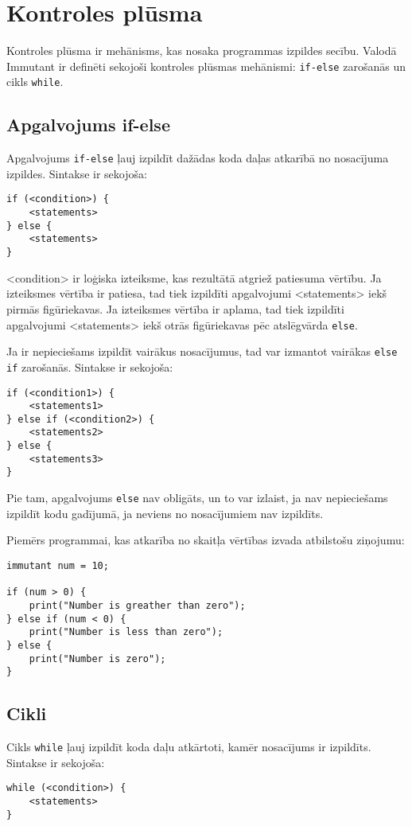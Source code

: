 \documentclass[12pt,a4paper]{report}
\begin{document}
\section{Kontroles plūsma}
Kontroles plūsma ir mehānisms, kas nosaka programmas izpildes secību. Valodā Immutant ir definēti sekojoši kontroles plūsmas mehānismi: \texttt{if-else} zarošanās un cikls \texttt{while}.

\subsection{Apgalvojums if-else}

Apgalvojums \texttt{if-else} ļauj izpildīt dažādas koda daļas atkarībā no nosacījuma izpildes. Sintakse ir sekojoša:
\begin{verbatim}
if (<condition>) {
    <statements>
} else {
    <statements>
}
\end{verbatim}

<condition> ir loģiska izteiksme, kas rezultātā atgriež patiesuma vērtību. Ja izteiksmes vērtība ir patiesa, tad tiek izpildīti apgalvojumi <statements> iekš pirmās figūriekavas. Ja izteiksmes vērtība ir aplama, tad tiek izpildīti apgalvojumi <statements> iekš otrās figūriekavas pēc atslēgvārda \texttt{else}.

Ja ir nepieciešams izpildīt vairākus nosacījumus, tad var izmantot vairākas \texttt{else if} zarošanās. Sintakse ir sekojoša:
\begin{verbatim}
if (<condition1>) {
    <statements1>
} else if (<condition2>) {
    <statements2>
} else {
    <statements3>
}
\end{verbatim}

Pie tam, apgalvojums \texttt{else} nav obligāts, un to var izlaist, ja nav nepieciešams izpildīt kodu gadījumā, ja neviens no nosacījumiem nav izpildīts.

Piemērs programmai, kas atkarība no skaitļa vērtības izvada atbilstošu ziņojumu:
\begin{verbatim}
immutant num = 10;

if (num > 0) {
    print("Number is greather than zero");
} else if (num < 0) {
    print("Number is less than zero");
} else {
    print("Number is zero");
}
\end{verbatim}

\subsection{Cikli}
Cikls \texttt{while} ļauj izpildīt koda daļu atkārtoti, kamēr nosacījums ir izpildīts. Sintakse ir sekojoša:
\begin{verbatim}
while (<condition>) {
    <statements>
}
\end{verbatim}
\end{document}
